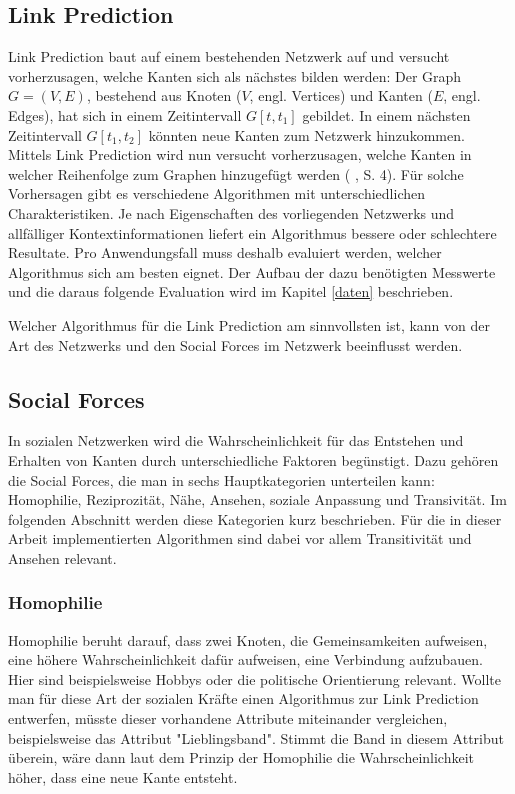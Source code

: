 \subsection{Link Prediction}
Link Prediction baut auf einem bestehenden Netzwerk auf und versucht vorherzusagen, welche Kanten sich als nächstes bilden werden:
Der Graph $G = (V, E)$, bestehend aus Knoten ($V$, engl. Vertices) und Kanten ($E$, engl. Edges), hat sich in einem Zeitintervall $G[t, t_1]$ gebildet.
In einem nächsten Zeitintervall $G[t_1, t_2]$ könnten neue Kanten zum Netzwerk hinzukommen.
Mittels Link Prediction wird nun versucht vorherzusagen, welche Kanten in welcher Reihenfolge zum Graphen hinzugefügt werden (\citeauthor{gao_link_2015} \citeyear{gao_link_2015}, S. 4).
Für solche Vorhersagen gibt es verschiedene Algorithmen mit unterschiedlichen Charakteristiken.
Je nach Eigenschaften des vorliegenden Netzwerks und allfälliger Kontextinformationen liefert ein Algorithmus bessere oder schlechtere Resultate.
Pro Anwendungsfall muss deshalb evaluiert werden, welcher Algorithmus sich am besten eignet.
Der Aufbau der dazu benötigten Messwerte und die daraus folgende Evaluation wird im Kapitel \ref{daten} beschrieben.

Welcher Algorithmus für die Link Prediction am sinnvollsten ist, kann von der Art des Netzwerks und den Social Forces im Netzwerk beeinflusst werden.

\subsection{Social Forces}
\label{socialforces}
In sozialen Netzwerken wird die Wahrscheinlichkeit für das Entstehen und Erhalten von Kanten durch unterschiedliche
Faktoren begünstigt. Dazu gehören die Social Forces, die man in sechs Hauptkategorien unterteilen kann: Homophilie,
Reziprozität, Nähe, Ansehen, soziale Anpassung und Transivität. Im folgenden Abschnitt werden diese Kategorien kurz
beschrieben. Für die in dieser Arbeit implementierten Algorithmen sind dabei vor allem Transitivität und Ansehen
relevant.

\subsubsection{Homophilie}
Homophilie beruht darauf, dass zwei Knoten, die Gemeinsamkeiten aufweisen, eine höhere Wahrscheinlichkeit dafür
aufweisen, eine Verbindung aufzubauen. Hier sind beispielsweise Hobbys oder die politische Orientierung relevant. Wollte
man für diese Art der sozialen Kräfte einen Algorithmus zur Link Prediction entwerfen, müsste dieser vorhandene
Attribute miteinander vergleichen, beispielsweise das Attribut "Lieblingsband". Stimmt die Band in diesem Attribut
überein, wäre dann laut dem Prinzip der Homophilie die Wahrscheinlichkeit höher, dass eine neue Kante entsteht.


